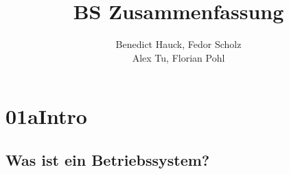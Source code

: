\documentclass[a4paper]{scrreprt}
\begin{document}
\title{BS Zusammenfassung}
\author{Benedict Hauck, Fedor Scholz\\Alex Tu, Florian Pohl}
\maketitle

\tableofcontents
\vspace{1cm}

\chapter{01aIntro}

\section{Was ist ein Betriebssystem?}
\end{document}
